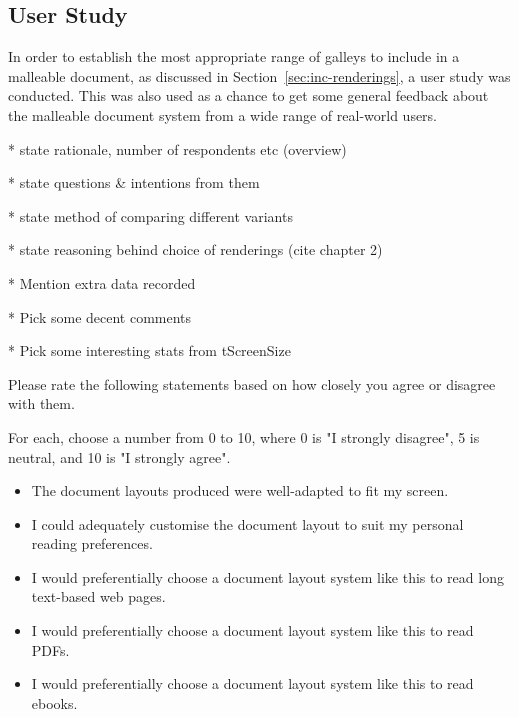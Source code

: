 \subsection{User Study}

In order to establish the most appropriate range of galleys to include in a malleable document, as discussed in Section~\ref{sec:inc-renderings}, a user study was conducted. This was also used as a chance to get some general feedback about the malleable document system from a wide range of real-world users.


* state rationale, number of respondents etc (overview)

* state questions \& intentions from them

* state method of comparing different variants

* state reasoning behind choice of renderings (cite chapter 2)

* Mention extra data recorded

* Pick some decent comments

* Pick some interesting stats from tScreenSize

Please rate the following statements based on how closely you agree or disagree with them.

For each, choose a number from 0 to 10, where 0 is "I strongly disagree", 5 is neutral, and 10 is "I strongly agree".
\begin{itemize}
\item The document layouts produced were well-adapted to fit my screen.
\item I could adequately customise the document layout to suit my personal reading preferences.
\item I would preferentially choose a document layout system like this to read long text-based web pages.
\item I would preferentially choose a document layout system like this to read PDFs.
\item I would preferentially choose a document layout system like this to read ebooks.
\end{itemize}


